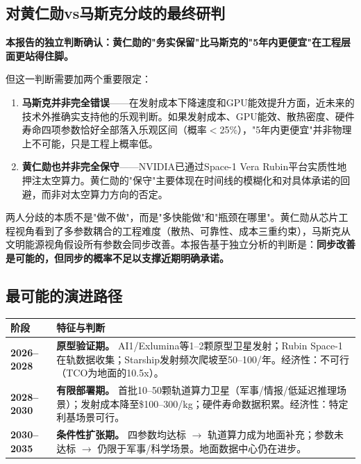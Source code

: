 \subsection{对黄仁勋vs马斯克分歧的最终研判}

\textbf{本报告的独立判断确认：黄仁勋的"务实保留"比马斯克的"5年内更便宜"在工程层面更站得住脚。}

但这一判断需要加两个重要限定：

\begin{enumerate}[leftmargin=*]
    \item \textbf{马斯克并非完全错误}——在发射成本下降速度和GPU能效提升方面，近未来的技术外推确实支持他的乐观判断。如果发射成本、GPU能效、散热密度、硬件寿命四项参数恰好全部落入乐观区间（概率$<$25\%），"5年内更便宜"并非物理上不可能，只是工程上概率低。
    \item \textbf{黄仁勋也并非完全保守}——NVIDIA已通过Space-1 Vera Rubin平台实质性地押注太空算力。黄仁勋的"保守"主要体现在时间线的模糊化和对具体承诺的回避，而非对太空算力方向的否定。
\end{enumerate}

两人分歧的本质不是"做不做"，而是"多快能做"和"瓶颈在哪里"。黄仁勋从芯片工程视角看到了多参数耦合的工程难度（散热、可靠性、成本三重约束），马斯克从文明能源视角假设所有参数会同步改善。本报告基于独立分析的判断是：\textbf{同步改善是可能的，但同步的概率不足以支撑近期明确承诺。}

\subsection{最可能的演进路径}

\begin{center}
\begin{tabular}{p{3.0cm}p{11.0cm}}
\toprule
\textbf{阶段} & \textbf{特征与判断} \\
\midrule
\textbf{2026--2028} & \textbf{原型验证期。} AI1/Exlumina等1--2颗原型卫星发射；Rubin Space-1在轨数据收集；Starship发射频次爬坡至50--100/年。经济性：不可行（TCO为地面的10.5x）。 \\
\hline
\textbf{2028--2030} & \textbf{有限部署期。} 首批10--50颗轨道算力卫星（军事/情报/低延迟推理场景）；发射成本降至\$100--300/kg；硬件寿命数据积累。经济性：特定利基场景可行。 \\
\hline
\textbf{2030--2035} & \textbf{条件性扩张期。} 四参数均达标 $\rightarrow$ 轨道算力成为地面补充；参数未达标 $\rightarrow$ 仍限于军事/科学场景。地面数据中心仍在进步。 \\
\bottomrule
\end{tabular}
\end{center}

